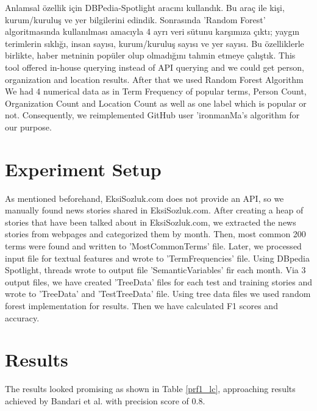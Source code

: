 \documentclass[conference]{IEEEtran}
\begin{document}
Anlamsal özellik için DBPedia-Spotlight \cite{isem2013daiber} aracını kullandık. Bu araç ile kişi, kurum/kuruluş ve yer bilgilerini edindik. Sonrasında 'Random Forest' \cite{random-forest} algoritmasında kullanılması amacıyla 4 ayrı veri sütunu karşımıza çıktı; yaygın terimlerin sıklığı, insan sayısı, kurum/kuruluş sayısı ve yer sayısı. Bu özelliklerle birlikte, haber metninin popüler olup olmadığını tahmin etmeye çalıştık.   This tool offered in-house querying instead of API querying and we could get person, organization and location results. After that we used Random Forest Algorithm  We had 4 numerical data as in Term Frequency of popular terms, Person Count, Organization Count and Location Count as well as one label which is popular or not. Consequently, we reimplemented GitHub user 'ironmanMa's algorithm for our purpose.

\section{Experiment Setup}
As mentioned beforehand, EksiSozluk.com does not provide an API, so we manually found news stories shared in EksiSozluk.com. After creating a heap of stories that have been talked about in EksiSozluk.com, we extracted the news stories from webpages and categorized them by month. Then, most common 200 terms were found and written to 'MostCommonTerms' file. Later, we processed input file for textual features and wrote to 'TermFrequencies' file. Using DBpedia Spotlight, threads wrote to output file 'SemanticVariables' fir each month. Via 3 output files, we have created 'TreeData' files for each test and training stories and wrote to 'TreeData' and 'TestTreeData' file. Using tree data files we used random forest implementation for results. Then we have calculated F1 scores and accuracy.

\section{Results}

The results looked promising as shown in Table \ref{prf1_lc}, approaching results achieved by Bandari et al. \cite{bandari_pulse_2012} with precision score of 0.8.
\end{document}
